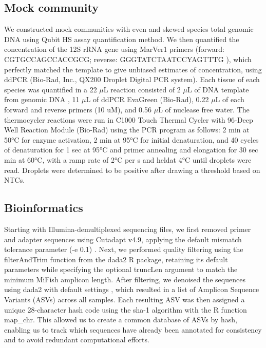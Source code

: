 \documentclass{article}
\begin{document}
\subsection*{Mock community}

We constructed mock communities with even and skewed species total genomic DNA using Qubit HS assay quantification method. We then quantified the concentration of the 12S rRNA gene using MarVer1 primers (forward: CGTGCCAGCCACCGCG; reverse: GGGTATCTAATCCYAGTTTG \cite{valsecchi2020}), which perfectly matched the template to give unbiased estimates of concentration, using ddPCR (Bio-Rad, Inc., QX200 Droplet Digital PCR system). Each tissue of each species was quantified in a 22 $\mu$L reaction consisted of 2 $\mu$L of DNA template from genomic DNA , 11 $\mu$L of ddPCR EvaGreen (Bio-Rad), 0.22 $\mu$L of each forward and reverse primers (10 uM), and 0.56 $\mu$L of nuclease free water. The thermocycler reactions were run in C1000 Touch Thermal Cycler with 96-Deep Well Reaction Module (Bio-Rad) using the PCR program as follows: 2 min at 50°C for enzyme activation, 2 min at 95°C for initial denaturation, and 40 cycles of denaturation for 1 sec at 95°C and primer annealing and elongation for 30 sec min at 60°C, with a ramp rate of 2°C per s and heldat 4°C until droplets were read. Droplets were determined to be positive after drawing a threshold based on NTCs.

\subsection*{Bioinformatics}
Starting with Illumina-demultiplexed sequencing files, we first removed primer and adapter sequences using Cutadapt v4.9, applying the default mismatch tolerance parameter (-e 0.1) \cite{martin2011}. Next, we performed quality filtering using the filterAndTrim function from the dada2 R package, retaining its default parameters while specifying the optional truncLen argument to match the minimum MiFish amplicon length. After filtering, we denoised the sequences using dada2 with default settings \cite{callahan2016}, which resulted in a list of Amplicon Sequence Variants (ASVs) across all samples. Each resulting ASV was then assigned a unique 28-character hash code using the sha-1 algorithm with the R function map\_chr. This allowed us to create a common database of ASVs by hash, enabling us to track which sequences have already been annotated for consistency and to avoid redundant computational efforts.
\end{document}
